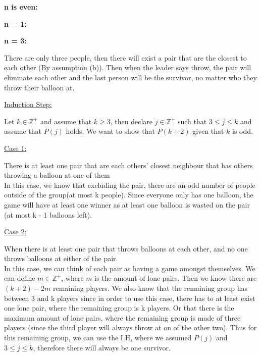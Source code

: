 \documentclass[20pt]{article}
\begin{document}
\noindent
\textbf{n is even:} 

\noindent
\textbf{n = 1:} 

\noindent
\textbf{n = 3:}
\begin{text}
    There are only three people, then there will exist a pair that are the closest to each other (By assumption (b)). Then when the leader says throw, the pair will eliminate each other and the last person will be the survivor, no matter who they throw their balloon at.\\
\end{text}

\noindent
\underline{Induction Step:}

\noindent
\begin{text}
    Let $k \in \mathbb{Z}^+$ and assume that $k\geq 3$, then declare $j \in \mathbb{Z}^+$ such that $3 \leq j \leq k$ and assume that $P(j)$ holds. We want to show that $P(k+2)$ given that $k$ is odd.\\
\end{text}

\noindent
\underline{Case 1:}
\begin{text}
    There is at least one pair that are each others' closest neighbour that has others throwing a balloon at one of them \\ 
    
    In this case, we know that excluding the pair, there are an odd number of people outside of the group(at most k people). Since everyone only has one balloon,  the game will have at least one winner as at least one balloon is wasted on the pair (at most k - 1 balloons left).\\
\end{text}

\noindent
\underline{Case 2:}
\begin{text}    
    When there is at least one pair that throws balloons at each other, and no one throws balloons at either of the pair. \\ 
    
    In this case, we can think of each pair as having a game amongst themselves. We can define $m \in \mathbb{Z}^+$, where $m$ is the amount of lone pairs. Then we know there are $(k+2) - 2m$ remaining players. We also know that the remaining group has between 3 and k players since in order to use this case, there has to at least exist one lone pair, where the remaining group is k players. Or that there is the maximum amount of lone pairs, where the remaining group is made of three players (since the third player will always throw at on of the other two). Thus for this remaining group, we can use the I.H, where we assumed $P(j)$ and $3 \leq j \leq k$, therefore there will always be one survivor.\\
\end{text}
\end{document}
